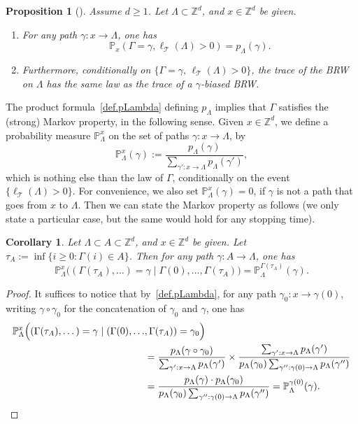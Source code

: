 \documentclass[JEP,XML,SOM,Unicode,NoFloatCountersInSection,published]{cedram}
\theoremstyle{plain}
\newtheorem{proposition}[theorem]{Proposition}
\newtheorem{corollary}[theorem]{Corollary}
\theoremstyle{definition}
\newcommand\Z{\mathbb{Z}}
\newcommand\T{\mathcal{T}}
\newcommand{\1}{{\text{\Large $\mathfrak 1$}}}
\begin{document}
\begin{proposition}[\cite{Zhu3}] \label{prop.Zhu.spine}
Assume $d\ge 1$. Let $\Lambda\subset \Z^d$,
and $x\in \mathbb Z^d$ be given.
\begin{enumerate}
\item For any path $\gamma:x\to \Lambda$, one has
\begin{equation*}%
\mathbb P_x(\Gamma = \gamma, \ell_{\T}(\Lambda)>0)=p_\Lambda(\gamma).
\end{equation*}
\item Furthermore, conditionally on $\{\Gamma=\gamma,\,
\ell_{\T}(\Lambda)>0\}$, the trace of the BRW
on $\Lambda$ has the same law as the trace of a $\gamma$-biased BRW.
\end{enumerate}
\end{proposition}
The product formula~\eqref{def.pLambda}
defining $p_\Lambda$ implies that $\Gamma$ satisfies the (strong)
Markov property, in the following sense.
Given $x\in \mathbb Z^d$, we define a probability measure $\mathbb P_\Lambda^x$ on the set of paths $\gamma:x\to \Lambda$, by
\[
\mathbb P_\Lambda^x(\gamma ) := \frac{p_\Lambda(\gamma)}{\sum_{\gamma':x\to \Lambda} p_\Lambda(\gamma')},
\]
which is nothing else than the law of $\Gamma$,
conditionally on the event $\{\ell_{\mathcal T}(\Lambda)>0\}$. For convenience, we also set $\mathbb P_\Lambda^x(\gamma) = 0$, if $\gamma$ is not a path that goes from $x$ to $\Lambda$.
Then we can state the Markov property as follows
(we only state a particular case, but the same would hold
for any stopping time).
\begin{corollary}\label{cor.spine.Markov}
Let $\Lambda\!\subset\! A\!\subset\! \mathbb Z^d$, and $x\!\in\! \mathbb Z^d$ be given. Let \hbox{$\tau_A:=\inf\{i\ge 0 :\Gamma(i) \!\in\! A\}$}.
Then for any path $\gamma:A\to \Lambda$, one has
\[
\mathbb P_\Lambda^x\Big((\Gamma(\tau_A), \dots)
=\gamma\mid \Gamma(0),\dots,\Gamma(\tau_A) \Big)
= \mathbb P_\Lambda^{\Gamma(\tau_A)}(\gamma).
\]
\end{corollary}
\begin{proof}
It suffices to notice that by~\eqref{def.pLambda}, for any path $\gamma_0:x\to \gamma(0)$,
writing $\gamma\circ \gamma_0$ for the concatenation of $\gamma_0$ and $\gamma$, one has
\begin{align*}
\mathbb P_\Lambda^x\Big((\Gamma(\tau_A),\dots)= \gamma\mid (\Gamma(0),\dots&,\Gamma(\tau_A)) = \gamma_0 \Big) \\
& = \frac{p_\Lambda(\gamma\circ \gamma_0)}{\sum_{\gamma':x\to \Lambda}p_\Lambda(\gamma')} \times \frac{\sum_{\gamma':x\to \Lambda} p_\Lambda(\gamma')}{p_\Lambda(\gamma_0)\sum_{\gamma'':\gamma(0)\to \Lambda} p_\Lambda(\gamma'')}\\
& = \frac{p_\Lambda(\gamma)\cdot p_\Lambda(\gamma_0)}{p_\Lambda(\gamma_0)\sum_{\gamma'':\gamma(0)\to \Lambda} p_\Lambda(\gamma'')} = \mathbb P_\Lambda^{\gamma(0)}(\gamma).\qedhere
\end{align*}
\end{proof}
\end{document}
